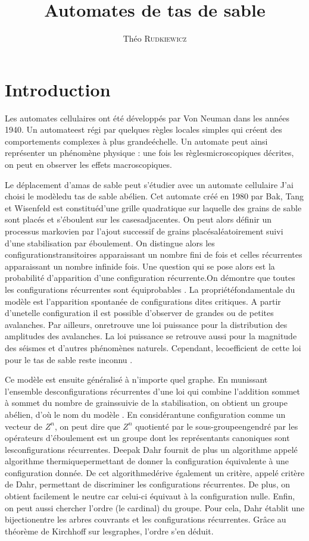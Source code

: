 \documentclass{report}
\title{Automates de tas de sable}
\author{Théo \textsc{Rudkiewicz}}
\begin{document}
\maketitle
\newpage
\tableofcontents

\chapter{Introduction}

Les automates cellulaires ont été développés par Von Neuman dans les années 1940. Un automateest régi par quelques règles locales simples qui créent des comportements complexes à plus grandeéchelle. Un automate peut ainsi représenter un phénomène physique : une fois les règlesmicroscopiques décrites, on peut en observer les effets macroscopiques. 

Le déplacement d’amas de sable peut s’étudier avec un automate cellulaire %
J’ai choisi le modèledu tas de sable abélien. Cet automate créé en 1980 par Bak, Tang et Wisenfeld \cite{thTang} est constituéd’une grille quadratique sur laquelle des grains de sable sont placés et s’éboulent sur les casesadjacentes. On peut alors définir un processus markovien par l’ajout successif de grains placésaléatoirement suivi d’une stabilisation par éboulement. On distingue alors les configurationstransitoires apparaissant un nombre fini de fois et celles récurrentes apparaissant un nombre infinide fois. Une question qui se pose alors est la probabilité d’apparition d’une configuration récurrente.On démontre que toutes les configurations récurrentes sont équiprobables \cite{thDhar}. La propriétéfondamentale du modèle est l’apparition spontanée de configurations dites critiques. A partir d’unetelle configuration il est possible d’observer de grandes ou de petites avalanches. Par ailleurs, onretrouve une loi puissance pour la distribution des amplitudes des avalanches. La loi puissance se
retrouve aussi pour la magnitude des séismes et d’autres phénomènes naturels. Cependant, lecoefficient de cette loi pour le tas de sable reste inconnu \cite{thPoly}. 

Ce modèle est ensuite généralisé à n’importe quel graphe. En munissant l’ensemble desconfigurations récurrentes d’une loi qui combine l’addition sommet à sommet du nombre de grainssuivie de la stabilisation, on obtient un groupe abélien, d’où le nom du modèle \cite{thDhar}. En considérantune configuration comme un vecteur de $Z^n$, on peut dire que $Z^n$ quotienté par le sous-groupeengendré par les opérateurs d’éboulement est un groupe dont les représentants canoniques sont lesconfigurations récurrentes. Deepak Dahr fournit de plus un algorithme appelé algorithme thermiquepermettant de donner la configuration équivalente à une configuration donnée. De cet algorithmedérive également un critère, appelé critère de Dahr, permettant de discriminer les configurations récurrentes. De plus, on obtient facilement le neutre car celui-ci équivaut à la configuration nulle. Enfin, on peut aussi chercher l’ordre (le cardinal) du groupe. Pour cela, Dahr établit une bijectionentre les arbres couvrants et les configurations récurrentes. Grâce au théorème de Kirchhoff sur lesgraphes, l’ordre s’en déduit.
\end{document}
